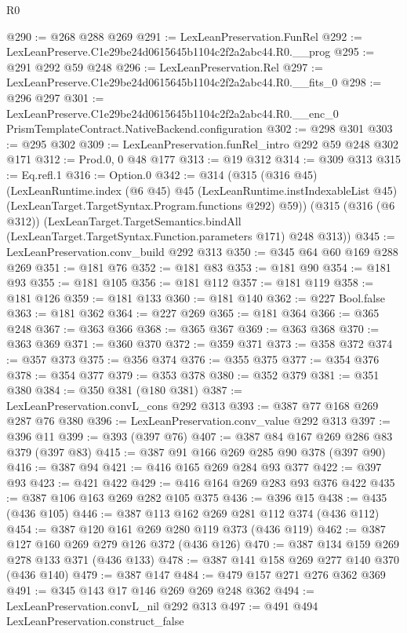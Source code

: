 \begin{lexlean}{R0}
\begin{coremodule}
@290 := @268 @288 @269
@291 := LexLeanPreservation.FunRel
@292 := LexLeanPreserve.C1e29be24d0615645b1104c2f2a2abc44.R0.__prog
@295 := @291 @292 @59 @248
@296 := LexLeanPreservation.Rel
@297 := LexLeanPreserve.C1e29be24d0615645b1104c2f2a2abc44.R0.__fits_0
@298 := @296 @297
@301 := LexLeanPreserve.C1e29be24d0615645b1104c2f2a2abc44.R0.__enc_0
    PrismTemplateContract.NativeBackend.configuration
@302 := @298 @301
@303 := @295 @302
@309 := LexLeanPreservation.funRel_intro @292 @59 @248 @302 @171
@312 := Prod.{0, 0} @48 @177
@313 := @19 @312
@314 := @309 @313
@315 := Eq.refl.{1}
@316 := Option.{0}
@342 := @314
    (@315
      (@316 @45)
      (LexLeanRuntime.index
        (@6 @45)
        @45
        (LexLeanRuntime.instIndexableList @45)
        (LexLeanTarget.TargetSyntax.Program.functions @292)
        @59))
    (@315
      (@316 (@6 @312))
      (LexLeanTarget.TargetSemantics.bindAll
        (LexLeanTarget.TargetSyntax.Function.parameters @171)
        @248
        @313))
@345 := LexLeanPreservation.conv_build @292 @313
@350 := @345 @64 @60 @169 @288 @269
@351 := @181 @76
@352 := @181 @83
@353 := @181 @90
@354 := @181 @93
@355 := @181 @105
@356 := @181 @112
@357 := @181 @119
@358 := @181 @126
@359 := @181 @133
@360 := @181 @140
@362 := @227 Bool.false
@363 := @181 @362
@364 := @227 @269
@365 := @181 @364
@366 := @365 @248
@367 := @363 @366
@368 := @365 @367
@369 := @363 @368
@370 := @363 @369
@371 := @360 @370
@372 := @359 @371
@373 := @358 @372
@374 := @357 @373
@375 := @356 @374
@376 := @355 @375
@377 := @354 @376
@378 := @354 @377
@379 := @353 @378
@380 := @352 @379
@381 := @351 @380
@384 := @350 @381 (@180 @381)
@387 := LexLeanPreservation.convL_cons @292 @313
@393 := @387 @77 @168 @269 @287 @76 @380
@396 := LexLeanPreservation.conv_value @292 @313
@397 := @396 @11
@399 := @393 (@397 @76)
@407 := @387 @84 @167 @269 @286 @83 @379 (@397 @83)
@415 := @387 @91 @166 @269 @285 @90 @378 (@397 @90)
@416 := @387 @94
@421 := @416 @165 @269 @284 @93 @377
@422 := @397 @93
@423 := @421 @422
@429 := @416 @164 @269 @283 @93 @376 @422
@435 := @387 @106 @163 @269 @282 @105 @375
@436 := @396 @15
@438 := @435 (@436 @105)
@446 := @387 @113 @162 @269 @281 @112 @374 (@436 @112)
@454 := @387 @120 @161 @269 @280 @119 @373 (@436 @119)
@462 := @387 @127 @160 @269 @279 @126 @372 (@436 @126)
@470 := @387 @134 @159 @269 @278 @133 @371 (@436 @133)
@478 := @387 @141 @158 @269 @277 @140 @370 (@436 @140)
@479 := @387 @147
@484 := @479 @157 @271 @276 @362 @369
@491 := @345 @143 @17 @146 @269 @269 @248 @362
@494 := LexLeanPreservation.convL_nil @292 @313
@497 := @491 @494 LexLeanPreservation.construct_false

\end{coremodule}
\end{lexlean}
